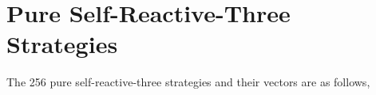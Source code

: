 \documentclass{article}
\theoremstyle{definition}
\begin{document}







\section{Pure Self-Reactive-Three Strategies}\label{section:pure_self_reactive_n3}

The 256 pure self-reactive-three strategies and their vectors are as follows,

\begin{multicols}{3}

\end{multicols}

~\\

\end{document}
